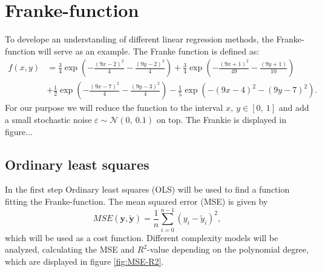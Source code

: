 \section{Franke-function}\label{section:Franke-function}
To develope an understanding of different linear regression methods, the Franke-function will serve as an example. The Franke function is defined as:
\begin{equation}
    \begin{split}
f(x,y) &= \frac{3}{4}\exp{\left(-\frac{(9x-2)^2}{4} - \frac{(9y-2)^2}{4}\right)}+\frac{3}{4}\exp{\left(-\frac{(9x+1)^2}{49}- \frac{(9y+1)}{10}\right)} \\
&+\frac{1}{2}\exp{\left(-\frac{(9x-7)^2}{4} - \frac{(9y-3)^2}{4}\right)} -\frac{1}{5}\exp{\left(-(9x-4)^2 - (9y-7)^2\right) }.
    \end{split}
\end{equation}
For our purpose we will reduce the function to the interval $x,~y \in [0,~1]$ and add a small stochastic noise $\varepsilon \sim \mathcal{N}(0,~0.1)$ on top. The Frankie is displayed in figure...



\subsection{Ordinary least squares}
In the first step Ordinary least squares (OLS) will be used to find a function fitting the Franke-function. The mean squared error (MSE) is given by
\begin{equation}
    MSE(\boldsymbol{y},\tilde{\boldsymbol{y}}) = \frac{1}{n}
\sum_{i=0}^{n-1}(y_i-\tilde{y}_i)^2,
\end{equation}
which will be used as a cost function. Different complexity models will be analyzed, calculating the MSE and $R^2$-value depending on the polynomial degree, which are displayed in figure \ref{fig:MSE-R2}. 

